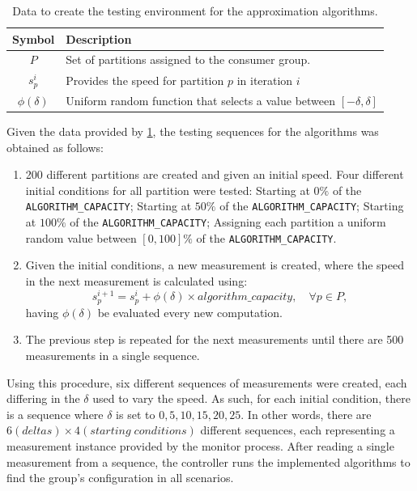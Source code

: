 \begin{table}[H]
\centering
\caption{Data to create the testing environment for the approximation algorithms.}
\label{table:testing_data}
\begin{tabular}{ |c|l| } 
    \hline
    \textbf{Symbol} & \textbf{Description} \\ 
    \hline
    $P$ & Set of partitions assigned to the consumer group. \\
    $s_p^i$ & Provides the speed for partition $p$ in iteration $i$ \\ 
    $\phi(\delta)$ & Uniform random function that selects a value between $[-\delta, \delta]$\\
    \hline
\end{tabular}
\end{table}

Given the data provided by \ref{table:testing_data}, the testing sequences for the algorithms was obtained as follows:
\begin{enumerate}
    \item 200 different partitions are created and given an initial speed. Four different initial conditions for all partition were tested: Starting at $0\%$ of the \lstinline[language=Python]{ALGORITHM_CAPACITY}; Starting at $50\%$ of the \lstinline[language=Python]{ALGORITHM_CAPACITY}; Starting at $100\%$ of the \lstinline[language=Python]{ALGORITHM_CAPACITY}; Assigning each partition a uniform random value between $[0, 100]\%$ of the \lstinline[language=Python]{ALGORITHM_CAPACITY}.
    
    \item Given the initial conditions, a new measurement is created, where the speed in the next measurement is calculated using:
    \begin{equation}
        s_p^{i+1} = s_p^i + \phi(\delta) \times algorithm\_capacity, \quad \forall p \in P,
    \end{equation}
    having $\phi(\delta)$ be evaluated every new computation.
    
    \item The previous step is repeated for the next measurements until there are 500 measurements in a single sequence.
\end{enumerate}

Using this procedure, six different sequences of measurements were created, each differing in the $\delta$ used to vary the speed. As such, for each initial condition, there is a sequence where $\delta$ is set to $0, 5, 10, 15, 20, 25$. In other words, there are $6 (deltas) \times 4 (starting\; conditions)$ different sequences, each representing a measurement instance provided by the monitor process. After reading a single measurement from a sequence, the controller runs the implemented algorithms to find the group's configuration in all scenarios.

